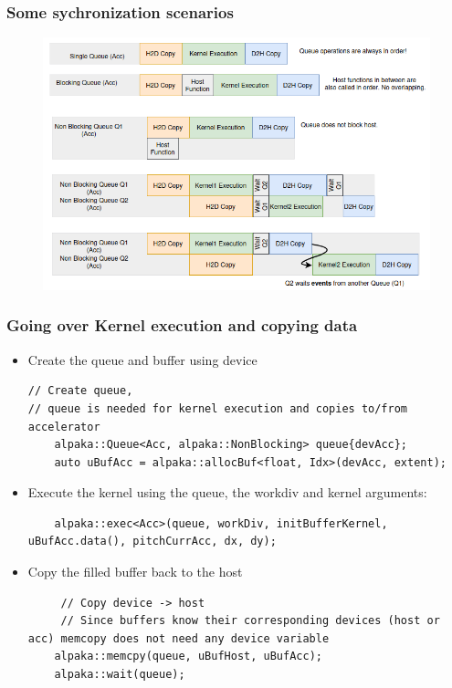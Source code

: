 \documentclass[9pt]{beamer}
\begin{document}
\begin{frame}
\frametitle{Some sychronization scenarios}
\begin{figure}
    \centering
    \includegraphics[width=0.93\linewidth]{Screenshot from 2024-10-16 16-53-06.png}
    \label{fig:enter-label}
\end{figure}
\end{frame}



\begin{frame}[fragile]
\frametitle{Going over Kernel execution and copying data}
\begin{itemize}

\item Create the queue and buffer using device
\lstset{basicstyle=\ttfamily\scriptsize}
\begin{lstlisting}
// Create queue,
// queue is needed for kernel execution and copies to/from accelerator
    alpaka::Queue<Acc, alpaka::NonBlocking> queue{devAcc};
    auto uBufAcc = alpaka::allocBuf<float, Idx>(devAcc, extent);
\end{lstlisting}

\item Execute the kernel using the queue, the workdiv and kernel arguments:
\lstset{basicstyle=\ttfamily\scriptsize}
\begin{lstlisting}
    alpaka::exec<Acc>(queue, workDiv, initBufferKernel, uBufAcc.data(), pitchCurrAcc, dx, dy);
\end{lstlisting}
\item Copy the filled buffer back to the host
\begin{lstlisting}
     // Copy device -> host
     // Since buffers know their corresponding devices (host or acc) memcopy does not need any device variable
    alpaka::memcpy(queue, uBufHost, uBufAcc);
    alpaka::wait(queue);
\end{lstlisting}
\end{itemize}
\end{frame}
\end{document}
